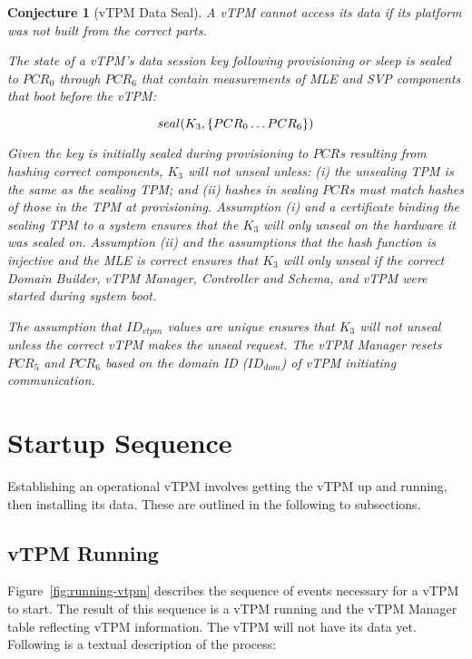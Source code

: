\documentclass[10pt]{article}
\newtheorem{conjecture}{Conjecture}
\begin{document}
\begin{conjecture}[vTPM Data Seal]
  A vTPM cannot access its data if its platform was not built from the
  correct parts.

  The state of a vTPM's data session key following provisioning or
  sleep is sealed to $PCR_0$ through $PCR_6$ that contain measurements
  of MLE and SVP components that boot before the vTPM:

  \[seal(K_{3},\{PCR_0\ldots PCR_6\})\]

  Given the key is initially sealed during provisioning to $PCR$s
  resulting from hashing correct components, $K_{3}$ will not unseal
  unless: (i) the unsealing TPM is the same as the sealing TPM; and
  (ii) hashes in sealing $PCR$s must match hashes of those in the TPM
  at provisioning.  Assumption (i) and a certificate binding the
  sealing TPM to a system ensures that the $K_{3}$ will only unseal on
  the hardware it was sealed on.  Assumption (ii) and the assumptions
  that the hash function is injective and the MLE is correct ensures
  that $K_{3}$ will only unseal if the correct Domain Builder, vTPM
  Manager, Controller and Schema, and vTPM were started during system
  boot.

  The assumption that $ID_{vtpm}$ values are unique ensures that $K_{3}$
  will not unseal unless the correct vTPM makes the unseal request.
  The vTPM Manager resets $PCR_5$ and $PCR_6$ based on the domain ID
  ($ID_{dom}$) of vTPM initiating communication.
\end{conjecture}

\section{Startup Sequence}

Establishing an operational vTPM involves getting the vTPM up and
running, then installing its data.  These are outlined in the
following to subsections.

\subsection{vTPM Running}

Figure~\ref{fig:running-vtpm} describes the sequence of events
necessary for a vTPM to start.  The result of this sequence is a vTPM
running and the vTPM Manager table reflecting vTPM information.  The
vTPM will not have its data yet.  Following is a textual description
of the process:
\end{document}
